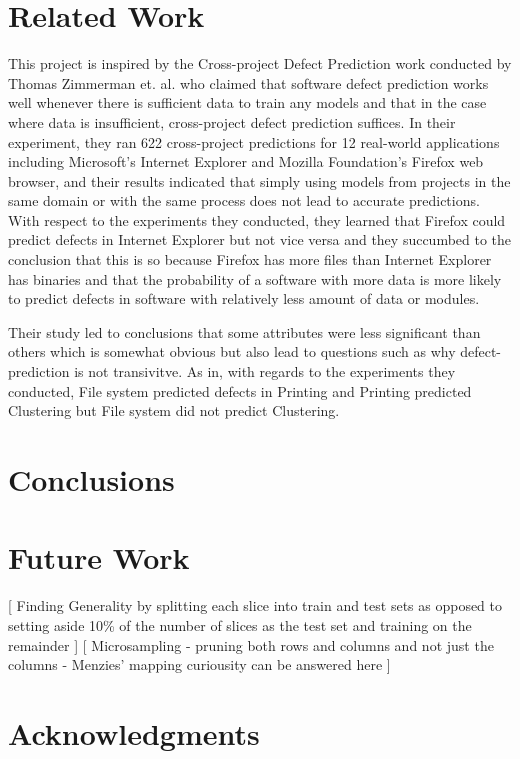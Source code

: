 \documentclass{sig-alternate}
\begin{document}
\section{Related Work}
This project is inspired by the Cross-project Defect Prediction work conducted by Thomas Zimmerman et. al. who claimed that software defect prediction works well whenever there is sufficient data to train any models and that in the case where data is insufficient, cross-project defect prediction suffices\cite{zimmerman09}. In their experiment, they ran 622 cross-project predictions for 12 real-world applications including Microsoft's Internet Explorer and Mozilla Foundation's Firefox web browser, and their results indicated that simply using models from projects in the same domain or with the same process does not lead to accurate predictions. With respect to the experiments they conducted, they learned that Firefox could predict defects in Internet Explorer but not vice versa and they succumbed to the conclusion that this is so because Firefox has more files than Internet Explorer has binaries and that the probability of a software with more data is more likely to predict defects in software with relatively less amount of data or modules.

Their study led to conclusions that some attributes were less significant than others which is somewhat obvious but also lead to questions such as why defect-prediction is not transivitve. As in, with regards to the experiments they conducted, File system predicted defects in Printing and Printing predicted Clustering but File system did not predict Clustering.

\section{Conclusions}


\section{Future Work}
[ Finding Generality by splitting each slice into train and test sets as opposed to setting aside 10\% of the number of slices as the test set and training on the remainder ]
[ Microsampling - pruning both rows and columns and not just the columns - Menzies' mapping curiousity can be answered here ]

\section{Acknowledgments}

%

%
%
\end{document}
